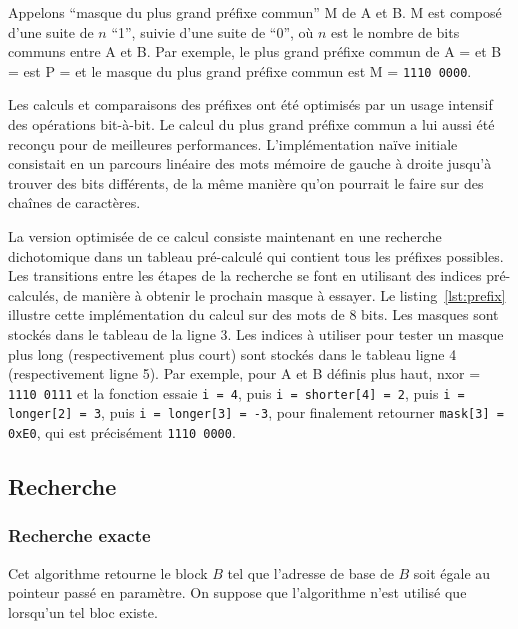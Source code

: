 


Appelons ``masque du plus grand préfixe commun'' M de A et B. M est composé
d'une suite de $n$ ``1'', suivie d'une suite de ``0'', où $n$ est le nombre de
bits communs entre A et B.
Par exemple, le plus grand préfixe commun de A =  et
B =  est P =   et le
masque du plus grand préfixe commun est M = \texttt{1110\,0000}.

Les calculs et comparaisons des préfixes ont été optimisés par un usage
intensif des opérations bit-à-bit.
Le calcul du plus grand préfixe commun a lui aussi été reconçu pour de
meilleures performances.
L'implémentation naïve initiale consistait en un parcours linéaire des mots
mémoire de gauche à droite jusqu'à trouver des bits différents, de la même
manière qu'on pourrait le faire sur des chaînes de caractères.

La version optimisée de ce calcul consiste maintenant en une recherche
dichotomique dans un tableau pré-calculé qui contient tous les préfixes
possibles.
Les transitions entre les étapes de la recherche se font en utilisant des
indices pré-calculés, de manière à obtenir le prochain masque à essayer.
Le listing~\ref{lst:prefix} illustre cette implémentation du calcul sur des
mots de 8 bits.
Les masques sont stockés dans le tableau de la ligne 3.
Les indices à utiliser pour tester un masque plus long (respectivement plus
court) sont stockés dans le tableau ligne 4 (respectivement ligne 5).
Par exemple, pour A et B définis plus haut, nxor = \texttt{1110\,0111}
et la fonction essaie \lstinline'i = 4', puis \lstinline'i = shorter[4] = 2',
puis \lstinline'i = longer[2] = 3', puis \lstinline'i = longer[3] = -3', pour
finalement retourner \lstinline'mask[3] = 0xE0', qui
est précisément \texttt{1110\,0000}.


\subsection{Recherche}


\subsubsection*{Recherche exacte}


Cet algorithme retourne le block $B$ tel que l'adresse de base de $B$ soit égale
au pointeur passé en paramètre.
On suppose que l'algorithme n'est utilisé que lorsqu'un tel bloc existe.

